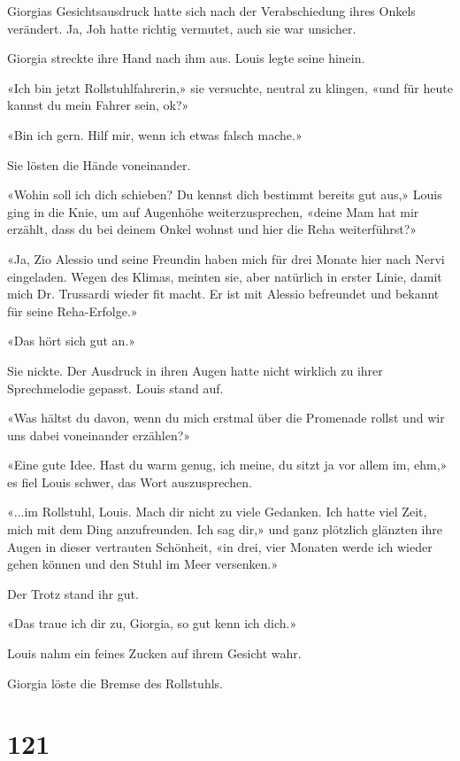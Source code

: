 Giorgias Gesichtsausdruck hatte sich nach der Verabschiedung ihres
Onkels verändert. Ja, Joh hatte richtig vermutet, auch sie war unsicher.

Giorgia streckte ihre Hand nach ihm aus. Louis legte seine hinein.

«Ich bin jetzt Rollstuhlfahrerin,» sie versuchte, neutral zu klingen,
«und für heute kannst du mein Fahrer sein, ok?»

«Bin ich gern. Hilf mir, wenn ich etwas falsch mache.»

Sie lösten die Hände voneinander.

«Wohin soll ich dich schieben? Du kennst dich bestimmt bereits gut aus,»
Louis ging in die Knie, um auf Augenhöhe weiterzusprechen, «deine Mam
hat mir erzählt, dass du bei deinem Onkel wohnst und hier die Reha
weiterführst?»

«Ja, Zio Alessio und seine Freundin haben mich für drei Monate hier nach
Nervi eingeladen. Wegen des Klimas, meinten sie, aber natürlich in
erster Linie, damit mich Dr. Trussardi wieder fit macht. Er ist mit
Alessio befreundet und bekannt für seine Reha-Erfolge.»

«Das hört sich gut an.»

Sie nickte. Der Ausdruck in ihren Augen hatte nicht wirklich zu ihrer
Sprechmelodie gepasst. Louis stand auf.

«Was hältst du davon, wenn du mich erstmal über die Promenade rollst und
wir uns dabei voneinander erzählen?»

«Eine gute Idee. Hast du warm genug, ich meine, du sitzt ja vor allem
im, ehm,» es fiel Louis schwer, das Wort auszusprechen.

«...im Rollstuhl, Louis. Mach dir nicht zu viele Gedanken. Ich hatte
viel Zeit, mich mit dem Ding anzufreunden. Ich sag dir,» und ganz
plötzlich glänzten ihre Augen in dieser vertrauten Schönheit, «in drei,
vier Monaten werde ich wieder gehen können und den Stuhl im Meer
versenken.»

Der Trotz stand ihr gut.

«Das traue ich dir zu, Giorgia, so gut kenn ich dich.»

Louis nahm ein feines Zucken auf ihrem Gesicht wahr.

Giorgia löste die Bremse des Rollstuhls.

\chapter{121}\label{section-121}

